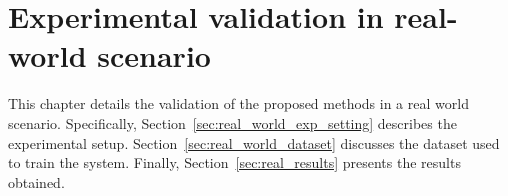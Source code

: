 \chapter{Experimental validation in real-world scenario}
\label{ch:real_world_application}
This chapter details the validation of the proposed methods in a real world scenario. Specifically, Section~\ref{sec:real_world_exp_setting} describes the experimental setup. Section~\ref{sec:real_world_dataset} discusses the dataset used to train the system. Finally, Section~\ref{sec:real_results} presents the results obtained.




